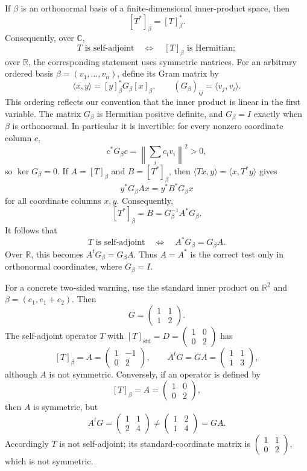 \begin{remark}
If \(\beta\) is an orthonormal basis of a finite-dimensional inner-product
space, then
\[
[T^*]_\beta=[T]_\beta^*.
\]
Consequently, over \(\mathbb C\),
\[
T\text{ is self-adjoint}
\quad\Longleftrightarrow\quad
[T]_\beta\text{ is Hermitian};
\]
over \(\mathbb R\), the corresponding statement uses symmetric matrices.
For an arbitrary ordered basis \(\beta=(v_1,\ldots,v_n)\), define its Gram
matrix by
\[
\langle x,y\rangle=[y]_\beta^*G_\beta[x]_\beta,
\qquad (G_\beta)_{ij}=\langle v_j,v_i\rangle.
\]
This ordering reflects our convention that the inner product is linear in
the first variable. The matrix \(G_\beta\) is Hermitian positive definite,
and \(G_\beta=I\) exactly when \(\beta\) is orthonormal.  In particular it is
invertible: for every nonzero coordinate column \(c\),
\[
c^*G_\beta c
=\left\|\sum_i c_iv_i\right\|^2>0,
\]
so \(\ker G_\beta=0\). If
\(A=[T]_\beta\) and \(B=[T^*]_\beta\), then
\(\langle Tx,y\rangle=\langle x,T^*y\rangle\) gives
\[
y^*G_\beta Ax=y^*B^*G_\beta x
\]
for all coordinate columns \(x,y\). Consequently,
\[
[T^*]_\beta=B=G_\beta^{-1}A^*G_\beta.
\]
It follows that
\[
T\text{ is self-adjoint}\quad\Longleftrightarrow\quad
A^*G_\beta=G_\beta A.
\]
Over \(\mathbb R\), this becomes \(A^tG_\beta=G_\beta A\). Thus \(A=A^*\)
is the correct test only in orthonormal coordinates, where \(G_\beta=I\).

For a concrete two-sided warning, use the standard inner product on
\(\mathbb R^2\) and \(\beta=(e_1,e_1+e_2)\). Then
\[
G=\begin{pmatrix}1&1\\1&2\end{pmatrix}.
\]
The self-adjoint operator \(T\) with
\([T]_{\mathrm{std}}=D=\begin{pmatrix}1&0\\0&2\end{pmatrix}\) has
\[
[T]_\beta=A=\begin{pmatrix}1&-1\\0&2\end{pmatrix},
\qquad A^tG=GA=\begin{pmatrix}1&1\\1&3\end{pmatrix},
\]
although \(A\) is not symmetric. Conversely, if an operator is defined by
\[
[T]_\beta=A=\begin{pmatrix}1&0\\0&2\end{pmatrix},
\]
then \(A\) is symmetric, but
\[
A^tG=\begin{pmatrix}1&1\\2&4\end{pmatrix}
\ne\begin{pmatrix}1&2\\1&4\end{pmatrix}=GA.
\]
Accordingly \(T\) is not self-adjoint; its standard-coordinate matrix is
\(\begin{pmatrix}1&1\\0&2\end{pmatrix}\), which is not symmetric.
\end{remark}

